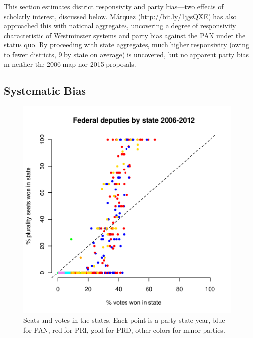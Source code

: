 \documentclass[letter,12pt]{article}
\begin{document}
This section estimates district responsivity and party bias---two effects of scholarly interest, discussed below. M\'arquez (\href{http://bit.ly/1jgsQXE}{\url{http://bit.ly/1jgsQXE}}) has also approached this with national aggregates, uncovering a degree of responsivity characteristic of Westminster systems and party bias against the PAN under the status quo. By proceeding with state aggregates, much higher responsivity (owing to fewer districts, 9 by state on average) is uncovered, but no apparent party bias in neither the 2006 map nor 2015 proposals. 

\subsection{Systematic Bias}

\begin{figure}
\begin{center}
    \includegraphics[width=.6\columnwidth]{resXedo20062012.pdf} 
\caption{Seats and votes in the states. Each point is a party-state-year, blue for PAN, red for PRI, gold for PRD, other colors for minor parties.}\label{F:seatsVotes}
\end{center}
\end{figure}
\end{document}
